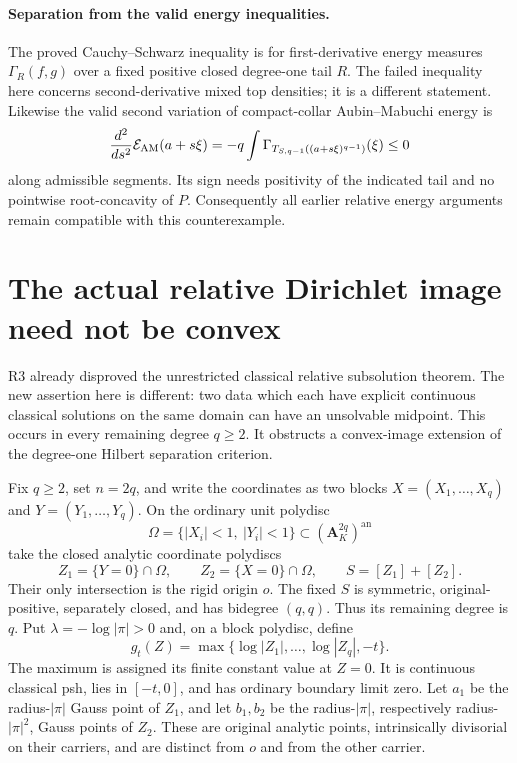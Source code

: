 \documentclass[11pt,a4paper]{article}
\numberwithin{equation}{section}
\theoremstyle{definition}
\theoremstyle{remark}
\newcommand{\an}{\mathrm{an}}
\begin{document}
\paragraph{Separation from the valid energy inequalities.}
The proved Cauchy--Schwarz inequality is for first-derivative energy
measures $\Gamma_R(f,g)$ over a fixed positive closed degree-one tail
$R$. The failed inequality here concerns second-derivative mixed top
densities; it is a different statement. Likewise the valid second
variation of compact-collar Aubin--Mabuchi energy is
\[
 \frac{d^2}{ds^2}\mathcal E_{\rm AM}(a+s\xi)
       =-q\int\Gamma_{T_{S,q-1}((a+s\xi)^{q-1})}(\xi)\le0
\]
along admissible segments. Its sign needs positivity of the indicated
tail and no pointwise root-concavity of $P$. Consequently all earlier
relative energy arguments remain compatible with this counterexample.



\section{The actual relative Dirichlet image need not be convex}
\label{sec:r6-nonlinear-dirichlet-image}

R3 already disproved the unrestricted classical relative subsolution
theorem. The new assertion here is different: two data which each
have explicit continuous classical solutions on the same domain can
have an unsolvable midpoint. This occurs in every remaining degree
$q\ge2$. It obstructs a convex-image extension of the degree-one
Hilbert separation criterion.

Fix $q\ge2$, set $n=2q$, and write the coordinates as two blocks
$X=(X_1,\ldots,X_q)$ and $Y=(Y_1,\ldots,Y_q)$. On the ordinary
unit polydisc
\[
 \Omega=\{|X_i|<1,\ |Y_i|<1\}\subset(\mathbf A_K^{2q})^{\an}
\]
take the closed analytic coordinate polydiscs
\[
       Z_1=\{Y=0\}\cap\Omega,\qquad
       Z_2=\{X=0\}\cap\Omega,
       \qquad S=[Z_1]+[Z_2].
\]
Their only intersection is the rigid origin $o$. The fixed $S$ is
symmetric, original-positive, separately closed, and has bidegree
$(q,q)$. Thus its remaining degree is $q$. Put
$\lambda=-\log|\pi|>0$ and, on a block polydisc, define
\[
       g_t(Z)=\max\{\log|Z_1|,\ldots,\log|Z_q|,-t\}.
\]
The maximum is assigned its finite constant value at $Z=0$.
It is continuous classical psh, lies in $[-t,0]$, and has ordinary
boundary limit zero. Let $a_1$ be the radius-$|\pi|$ Gauss point
of $Z_1$, and let $b_1,b_2$ be the radius-$|\pi|$, respectively
radius-$|\pi|^2$, Gauss points of $Z_2$. These are original analytic
points, intrinsically divisorial on their carriers, and are distinct
from $o$ and from the other carrier.
\end{document}
